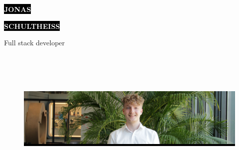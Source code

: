 \documentclass[9pt]{developercv} %
\begin{document}

\begin{minipage}[t]{0.45\textwidth} %
	\vspace{-\baselineskip} %
	
	\colorbox{black}{{\huge\textcolor{white}{\textbf{\MakeUppercase{Jonas}}}}} %
	
	\colorbox{black}{{\huge\textcolor{white}{\textbf{\MakeUppercase{Schultheiss}}}}} %
	
	\vspace{6pt}
	
	{\huge Full stack developer} %
\end{minipage}
\begin{minipage}[t]{0.32\textwidth} %
	\vspace{-\baselineskip} %
	
	\\
	\\
	\\	
\end{minipage}
\begin{figure}[!ht]
  \centering
  \colorbox{black}{\includegraphics[width=1\linewidth]{./me.jpg}}
\end{figure}
\end{document}

